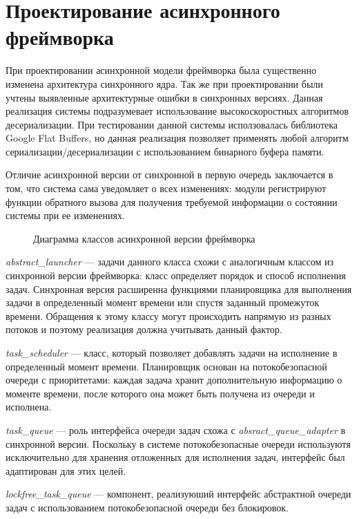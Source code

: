 \section{Проектирование асинхронного фреймворка}

При проектировании асинхронной модели фреймворка была существенно изменена архитектура синхронного ядра. Так же при проектировании были учтены выявленные архитектурные ошибки в синхронных версиях. Данная реализация системы подразумевает использование высокоскоростных алгоритмов десериализации. При тестировании данной системы исползовалась библиотека Google Flat Buffers, но данная реализация позволяет применять любой алгоритм сериализации/десериализации с использованием бинарного буфера памяти.

Отличие асинхронной версии от синхронной в первую очередь заключается в том, что система сама уведомляет о всех изменениях: модули регистрируют функции обратного вызова для получения требуемой информации о состоянии системы при ее изменениях.

\begin{figure}[h]
    \caption{Диаграмма классов асинхронной версии фреймворка}
    \label{im:2_3_1_async}
\end{figure}

\textit{abstract\_launcher} --- задачи данного класса схожи с аналогичным классом из синхронной версии фреймворка: класс определяет порядок и способ исполнения задач. Синхронная версия расширенна функциями планировщика для выполнения задачи в определенный момент времени или спустя заданный промежуток времени. Обращения к этому классу могут происходить напрямую из разных потоков и поэтому реализация должна учитывать данный фактор.

\textit{task\_scheduler} --- класс, который позволяет добавлять задачи на исполнение в определенный момент времени. Планировщик основан на потокобезопасной очереди с приоритетами: каждая задача хранит дополнительную информацию о моменте времени, после которого она может быть получена из очереди и исполнена.

\textit{task\_queue} --- роль интерфейса очереди задач схожа с \textit{absract\_queue\_adapter} в синхронной версии. Поскольку в системе потокобезопасные очереди используютя исключительно для хранения отложенных для исполнения задач, интерфейс был адаптирован для этих целей.

\textit{lockfree\_task\_queue} --- компонент, реализуюший интерфейс абстрактной очереди задач с использованием потокобезопасной очереди без блокировок.

